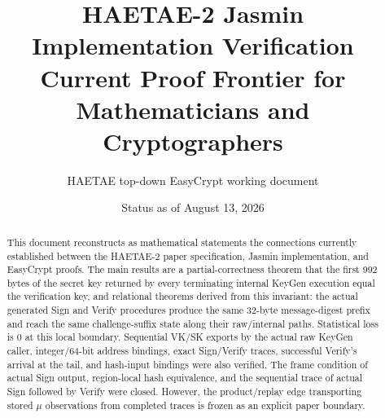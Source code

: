\documentclass[11pt,a4paper]{article}
\title{\textbf{HAETAE-2 Jasmin Implementation Verification}\\[0.4em]
  \Large Current Proof Frontier for Mathematicians and Cryptographers}
\author{HAETAE top-down EasyCrypt working document}
\date{Status as of August 13, 2026}
\begin{document}
\maketitle

\begin{abstract}
This document reconstructs as mathematical statements the connections currently
established between the HAETAE-2 paper specification, Jasmin implementation,
and EasyCrypt proofs. The main results are a partial-correctness theorem that
the first 992 bytes of the secret key returned by every terminating internal
KeyGen execution equal the verification key, and relational theorems derived
from this invariant: the actual generated Sign and Verify procedures produce
the same 32-byte message-digest prefix and reach the same challenge-suffix
state along their raw/internal paths. Statistical loss is 0 at this local
boundary. Sequential VK/SK exports by the actual raw KeyGen caller,
integer/64-bit address bindings, exact Sign/Verify traces, successful Verify's
arrival at the tail, and hash-input bindings were also verified. The frame
condition of actual Sign output, region-local hash equivalence, and the
sequential trace of actual Sign followed by Verify were closed. However, the
product/replay edge transporting stored \(\mu\) observations from completed
traces is frozen as an explicit paper boundary.


\end{abstract}
\end{document}
